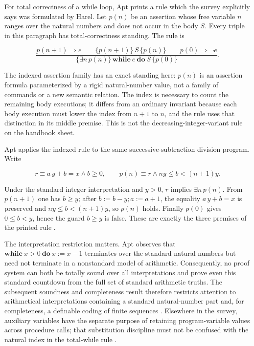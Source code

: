 For total correctness of a while loop, Apt prints a rule which the survey
explicitly says was formulated by Harel.  Let \(p(n)\) be an assertion whose
free variable \(n\) ranges over the natural numbers and does not occur in the
body \(S\).  Every triple in this paragraph has total-correctness standing.
The rule is

\[
\frac{
 p(n+1)\Rightarrow e
 \qquad
 \{p(n+1)\}\,S\,\{p(n)\}
 \qquad
 p(0)\Rightarrow\neg e
}{
 \{\exists n\,p(n)\}\,
 \mathbf{while}\ e\ \mathbf{do}\ S\,
 \{p(0)\}
}.
\tag{Harel's while Rule II}
\]

The indexed assertion family has an exact standing here: \(p(n)\) is an
assertion formula parameterized by a rigid natural-number value, not a family
of commands or a new semantic relation.  The index is necessary to count the
remaining body executions; it differs from an ordinary invariant because each
body execution must lower the index from \(n+1\) to \(n\), and the rule uses
that distinction in its middle premise.  This is not the
decreasing-integer-variant rule on the handbook sheet.

Apt applies the indexed rule to the same successive-subtraction division
program.  Write

\[
 r\equiv a\,y+b=x\land b\geq0,
 \qquad
 p(n)\equiv r\land ny\leq b<(n+1)y .
\]

Under the standard integer interpretation and \(y>0\), \(r\) implies
\(\exists n\,p(n)\).  From \(p(n+1)\) one has \(b\geq y\); after
\(b:=b-y;a:=a+1\), the equality \(a\,y+b=x\) is preserved and
\(ny\leq b<(n+1)y\), so \(p(n)\) holds.  Finally \(p(0)\) gives
\(0\leq b<y\), hence the guard \(b\geq y\) is false.  These are exactly the
three premises of the printed rule
\cite[pp.~441--442]{Apt1981}.

The interpretation restriction matters.  Apt observes that
\(\mathbf{while}\ x>0\ \mathbf{do}\ x:=x-1\) terminates over the standard
natural numbers but need not terminate in a nonstandard model of arithmetic.
Consequently, no proof system can both be totally sound over all
interpretations and prove even this standard countdown from the full set of
standard arithmetic truths.  The subsequent soundness and completeness result
therefore restricts attention to arithmetical interpretations containing a
standard natural-number part and, for completeness, a definable coding of
finite sequences \cite[pp.~442--443]{Apt1981}.  Elsewhere in the survey,
auxiliary variables have the separate purpose of retaining program-variable
values across procedure calls; that substitution discipline must not be
confused with the natural index in the total-while rule
\cite[p.~448]{Apt1981}.

